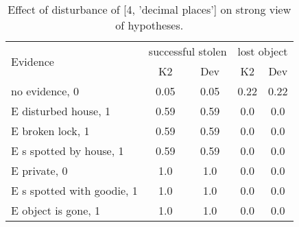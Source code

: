 \begin{table}\begin{tabular}{l|cc|cc}\toprule\multirow{2}{*}{Evidence} & \multicolumn{2}{c}{successful stolen}& \multicolumn{2}{c}{lost object}\\& {K2} & {Dev}& {K2} & {Dev}\\\midrule
no evidence, 0 & 0.05&0.05&0.22&0.22\\E disturbed house, 1 & 0.59&0.59&0.0&0.0\\E broken lock, 1 & 0.59&0.59&0.0&0.0\\E s spotted by house, 1 & 0.59&0.59&0.0&0.0\\E private, 0 & 1.0&1.0&0.0&0.0\\E s spotted with goodie, 1 & 1.0&1.0&0.0&0.0\\E object is gone, 1 & 1.0&1.0&0.0&0.0\\\bottomrule\end{tabular}\caption{Effect of disturbance of [4, 'decimal places'] on strong view of hypotheses.}\end{table}